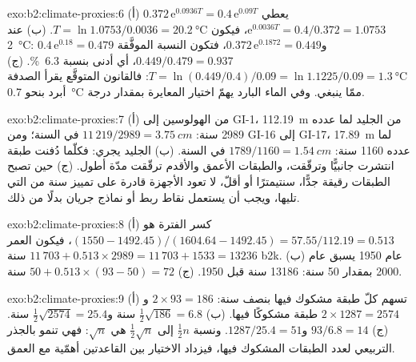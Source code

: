 \begin{solution}{exo:b2:climate-proxies:6}
(أ) $0.372\,\mathrm{e}^{0.0936T} = 0.4\,\mathrm{e}^{0.09T}$ يعطي $\mathrm{e}^{0.0036T} =
0.4/0.372 = 1.0753$، فيكون $T = \ln 1.0753/0.0036 = \qty{20.2}{\celsius}$. (ب) عند
\qty{2}{\celsius}: $0.4\,\mathrm{e}^{0.18} = 0.479$ و$0.372\,\mathrm{e}^{0.1872} = 0.449$، فتكون
النسبة الموفَّقة $0.449/0.479 = 0.937$، أي أدنى بنسبة \qty{6.3}{\percent}. (ج) $T = \ln(0.449/0.4)/0.09 =
\ln 1.1225/0.09 = \qty{1.3}{\celsius}$: فالقانون المتوقَّع يقرأ الصدفة أبرد بنحو
\qty{0.7}{\celsius} ممّا ينبغي. وفي الماء البارد يهمّ اختيار المعايرة بمقدار
درجة.
\end{solution}

\begin{solution}{exo:b2:climate-proxies:7}
(أ) من الهولوسين إلى GI-1، \qty{112.19}{m} من الجليد لما عدده 2989 سنة: $11\,219/2989 =
\qty{3.75}{cm}$ في السنة؛ ومن GI-16 إلى GI-17، \qty{17.89}{m} لما عدده 1160 سنة: $1789/1160 =
\qty{1.54}{cm}$ في السنة. (ب) الجليد
يجري: فكلّما دُفنت طبقة انتشرت جانبيًّا وترقّقت، والطبقات الأعمق والأقدم
ترقّقت مدّة أطول. (ج) حين تصبح الطبقات رقيقة جدًّا، سنتيمترًا أو أقلّ، لا تعود الأجهزة
قادرة على تمييز سنة من التي تليها، ويجب أن يستعمل  نقاط ربط أو نماذج جريان
بدلًا من ذلك.
\end{solution}

\begin{solution}{exo:b2:climate-proxies:8}
(أ) كسر الفترة هو $(1550 - 1492.45)/(1604.64 - 1492.45) = 57.55/112.19 = 0.513$،
فيكون العمر $11\,703 + 0.513 \times 2989 = 11\,703 + 1533 = \num{13236}$ سنة b2k. (ب) عام 1950 يسبق عام 2000 بمقدار 50
سنة: \num{13186} سنة قبل 1950. (ج) $50 + 0.513 \times (93 - 50) = 72$ سنة.
\end{solution}

\begin{solution}{exo:b2:climate-proxies:9}
(أ) تسهم كلّ طبقة مشكوك فيها بنصف سنة: $2 \times 93 = 186$ و$2 \times 1287 = 2574$
طبقة مشكوكًا فيها. (ب) $\frac12\sqrt{186} = 6.8$ سنة و$\frac12\sqrt{2574} = 25.4$ سنة.
(ج) $93/6.8 = 14$ و$1287/25.4 = 51$. ونسبة $\frac12 n$ إلى $\frac12\sqrt{n}$ هي
$\sqrt{n}$: فهي تنمو بالجذر التربيعي لعدد الطبقات المشكوك فيها، فيزداد الاختيار بين
القاعدتين أهمّية مع العمق.
\end{solution}

